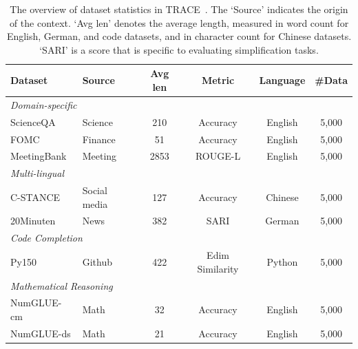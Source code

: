 \begin{table}[!h]
\centering
\begin{tabular}{llcccc}
\toprule
\textbf{Dataset}      & \textbf{Source}   & \textbf{Avg len} & \textbf{Metric}         & \textbf{Language} & \textbf{\#Data} \\
\midrule
\multicolumn{6}{l}{\cellcolor{gray!15}\textit{Domain-specific}} \\
ScienceQA   & Science    & 210   & Accuracy    & English & 5,000 \\
FOMC        & Finance    & 51    & Accuracy    & English & 5,000 \\
MeetingBank & Meeting    & 2853  & ROUGE-L     & English & 5,000 \\
\multicolumn{6}{l}{\cellcolor{gray!15}\textit{Multi-lingual}} \\
C-STANCE    & Social media & 127 & Accuracy    & Chinese & 5,000 \\
20Minuten   & News         & 382 & SARI        & German  & 5,000 \\
\multicolumn{6}{l}{\cellcolor{gray!15}\textit{Code Completion}} \\
Py150       & Github    & 422   & Edim Similarity & Python  & 5,000 \\
\multicolumn{6}{l}{\cellcolor{gray!15}\textit{Mathematical Reasoning}} \\
NumGLUE-cm  & Math      & 32    & Accuracy    & English & 5,000 \\
NumGLUE-ds  & Math      & 21    & Accuracy    & English & 5,000 \\
\bottomrule
\end{tabular}
\caption{
The overview of dataset statistics in TRACE~\cite{wang2023trace}. The `Source' indicates the origin of the context. `Avg len' denotes the average length, measured in word count for English, German, and code datasets, and in character count for Chinese datasets. `SARI' is a score that is specific to evaluating simplification tasks.
}
\label{tab:trace_datasets}
\end{table}

